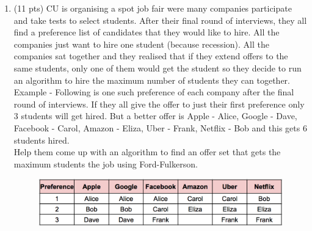 \documentclass[12pt]{article}
\theoremstyle{remark}
\newtheorem*{solution}{Solution}
\begin{document}
\begin{enumerate}
\begin{enumerate}
    \item (5 pts) Use the above proof (from part Q3a) to prove that the value of the flow $a$ $\leq$ Capacity of the cut $(X, Y)$.
\begin{solution}
$\newline$ There are two cases that can happen between cuts: $\newline$ Case 1: There is no inward flow. All flow is outward flow. This means the amount of flow is either the capacity or limited by some bottleneck edge further behind this point. $\newline$ Case 2: There is at least one inward flow from Y. This is inserted as a negative value, lowering the flow and making it less than the capacity. $\newline$ It is also fair to note that if any of these cases, we cannot reach above capacity in general following the capacity rule of flow graphs. This can always be further lowered by bottlenecks elsewhere at any point.
\end{solution}
\end{enumerate}



\pagebreak

\item (11 pts) CU is organising a spot job fair were many companies participate and take tests to select students. After their final round of interviews, they all find a preference list of candidates that they would like to hire. All the companies just want to hire one student (because recession). All the companies sat together and they realised that if they extend offers to the same students, only one of them would get the student so they decide to run an algorithm to hire the maximum number of students they can together. \\
Example - Following is one such preference of each company after the final round of interviews. If they all give the offer to just their first preference only 3 students will get hired. But a better offer is Apple - Alice, Google - Dave, Facebook - Carol, Amazon - Eliza, Uber - Frank, Netflix - Bob and this gets 6 students hired. \\

Help them come up with an algorithm to find an offer set that gets the maximum students the job using Ford-Fulkerson.
\begin{figure}[h!]
\begin{center}
\includegraphics[scale=0.8]{Job.png}
\end{center}
\end{figure}


\end{enumerate}
\end{document}
